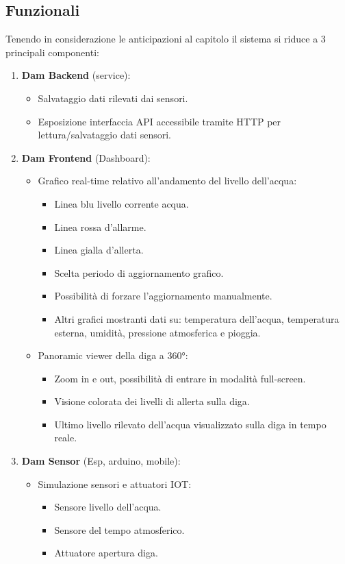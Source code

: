\documentclass{article}
\begin{document}
\subsection{Funzionali}
Tenendo in considerazione le anticipazioni al capitolo  il sistema si riduce a 3 principali componenti:
\begin{enumerate}
	\item \textbf{Dam Backend} (service):
	\begin{itemize}
		\item Salvataggio dati rilevati dai sensori.
		\item Esposizione interfaccia API accessibile tramite HTTP per lettura/salvataggio dati sensori.
	\end{itemize} 
	\item \textbf{Dam Frontend} (Dashboard):
	\begin{itemize}
		\item Grafico real-time relativo all'andamento del livello dell'acqua:
		\begin{itemize}
			\item Linea blu livello corrente acqua.
			\item Linea rossa d'allarme.
			\item Linea gialla d'allerta.
			\item Scelta periodo di aggiornamento grafico.
			\item Possibilità di forzare l'aggiornamento manualmente.
			\item Altri grafici mostranti dati su: temperatura dell'acqua, temperatura esterna, umidità, pressione atmosferica e pioggia.
		\end{itemize}
		\item Panoramic viewer della diga a 360°:
		\begin{itemize}
			\item Zoom in e out, possibilità di entrare in modalità full-screen.
			\item Visione colorata dei livelli di allerta sulla diga.
			\item Ultimo livello rilevato dell'acqua visualizzato sulla diga in tempo reale.
		\end{itemize}
	\end{itemize}
	\item \textbf{Dam Sensor} (Esp, arduino, mobile):
	\begin{itemize}
		\item Simulazione sensori e attuatori IOT:
		\begin{itemize}
			\item Sensore livello dell'acqua.
			\item Sensore del tempo atmosferico.
			\item Attuatore apertura diga.
		\end{itemize}
	\end{itemize}
\end{enumerate}
\end{document}
